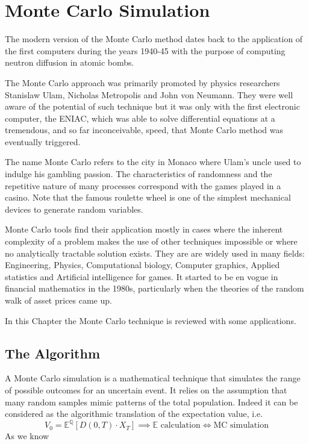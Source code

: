 \chapter{Monte Carlo Simulation}
\label{cap:montecarlo}

The modern version of the Monte Carlo method dates back to the application of the first computers during the years 1940-45 with the purpose of computing neutron diffusion in atomic bombs.

The Monte Carlo approach was primarily promoted by physics researchers Stanislaw Ulam, Nicholas Metropolis and John von Neumann. They were well aware of the potential of such technique but it was only with the first electronic computer, the ENIAC, which was able to solve differential equations at a tremendous, and so far inconceivable, speed, that Monte Carlo method was eventually triggered.

The name Monte Carlo refers to the city in Monaco where Ulam's uncle used to indulge his gambling passion. The characteristics of randomness and the repetitive nature of many processes correspond with the games played in a casino. Note that the famous roulette wheel is one of the simplest mechanical devices to generate random variables.

Monte Carlo tools find their application mostly in cases where the inherent complexity of a problem makes the use of other techniques impossible or where no analytically tractable solution exists.
They are are widely used in many fields: Engineering, Physics, Computational biology, Computer graphics, Applied statistics and Artificial intelligence for games. It started to be en vogue in financial mathematics in the 1980s, particularly when the theories of the random walk of asset prices came up.

In this Chapter the Monte Carlo technique is reviewed with some applications.

\section{The Algorithm}
\label{whats-monte-carlo-simulation}

A Monte Carlo simulation is a mathematical technique that simulates the range of possible outcomes for an uncertain event. It relies on the assumption that many random samples mimic patterns of the total population.
Indeed it can be considered as the algorithmic translation of the expectation value, i.e.
$$
V_0 = \mathbb{E}^{\mathbb{Q}} \left[ D(0,T)\cdot X_T \right] \implies \mathbb{E} \text{ calculation} \iff \text{MC simulation}
$$
As we know


